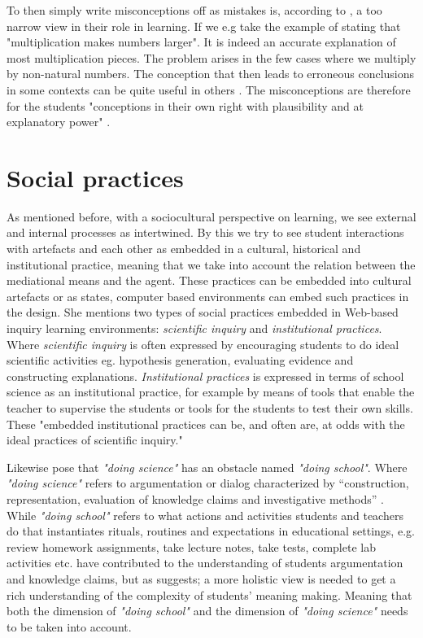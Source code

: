 To then simply write misconceptions off as mistakes is, according to \citet{smith1994misconceptions}, a too narrow view in their role in learning. If we e.g take the example of stating that "multiplication makes numbers larger". It is indeed an accurate explanation of most multiplication pieces. The problem arises in the few cases where we multiply by non-natural numbers. The conception that then leads to erroneous conclusions in some contexts can be quite useful in others \citep{smith1994misconceptions}. The misconceptions are therefore for the students "conceptions in their own right with plausibility and at explanatory power" \citetext{Smith, diSessa \& Roschelle 1993, referenced in \citealp{larkin2012misconceptions}}. 

\section{Social practices}
As mentioned before, with a sociocultural perspective on learning, we see external and internal processes as intertwined. By this we try to see student interactions with artefacts and each other as embedded in a cultural, historical and institutional practice, meaning that we take into account the relation between the mediational means and the agent. These practices can be embedded into cultural artefacts or as \citet{furberg2009socio} states, computer based environments can embed such practices in the design. She mentions two types of social practices embedded in Web-based inquiry learning environments: \emph{scientific inquiry} and \emph{institutional practices}.  Where \emph{scientific inquiry} is often expressed by encouraging students to do ideal scientific activities eg. hypothesis generation, evaluating evidence and constructing explanations. \emph{Institutional practices} is expressed in terms of school science as an institutional practice, for example by means of tools that enable the teacher to supervise the students or tools for the students to test their own skills. These "embedded institutional practices can be, and often are, at odds with the ideal practices of scientific inquiry." \citetext{Cinn \& Malhotra 2002, referenced in \citealp{furberg2009socio}} 

Likewise \citet{jimenez2000doing} pose that \emph{"doing science"} has an obstacle named \emph{"doing school"}. Where \emph{"doing science"} refers to argumentation or dialog characterized by “construction, representation, evaluation of knowledge claims and investigative methods” \citep{jimenez2000doing}. While \emph{"doing school"} refers to what actions and activities students and teachers do that instantiates rituals, routines and expectations in educational settings, e.g. review homework assignments, take lecture notes, take tests, complete lab activities etc. \citeauthor{jimenez2000doing} have contributed to the understanding of students argumentation and knowledge claims, but as \citet*{furberg2008students} suggests; a more holistic view is needed to get a rich understanding of the complexity of students' meaning making. Meaning that both the dimension of \emph{"doing school"} and the dimension of \emph{"doing science"} needs to be taken into account. 


